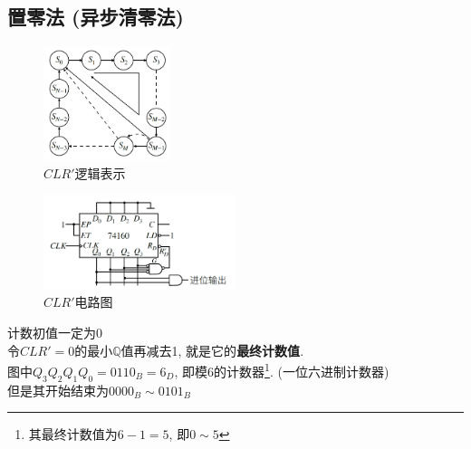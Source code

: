\documentclass[scheme=chinese,a4paper]{report}
\begin{document}
\subsection{置零法 (异步清零法)}
\begin{figure}[H]
\centering
\includegraphics[width=0.33\textwidth]{counter_clr.png}
\caption{$CLR'$逻辑表示}
\end{figure}
\begin{figure}[H]
\centering
\includegraphics[width=0.5\textwidth]{counter_clr_circuit.png}
\caption{$CLR'$电路图}
\end{figure}
计数初值一定为0\\
令$CLR'=0$的最小$\mathbb{Q}$值再减去1, 就是它的\textbf{最终计数值}. \\
图中$Q_3Q_2Q_1Q_0=0110_B=6_D$, 即模$6$的计数器\footnote{其最终计数值为$6-1=5$, 即$0\sim 5$}. (一位六进制计数器)\\
但是其开始结束为$0000_B\sim 0101_B$
\end{document}
